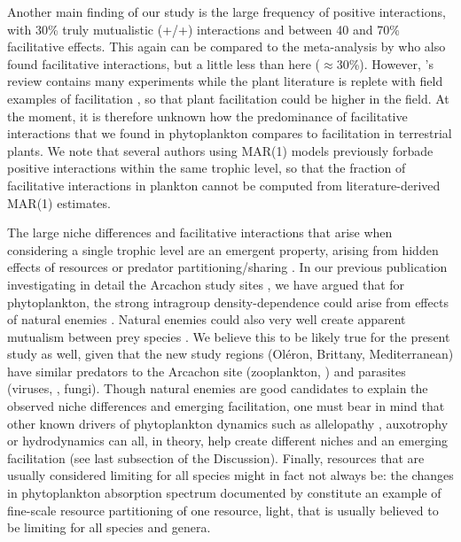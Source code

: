 \documentclass[10pt]{article}
\begin{document}
Another main finding of our study is the large frequency of positive
interactions, with 30\% truly mutualistic (+/+) interactions and between
40 and 70\% facilitative effects. This again can be compared to the
meta-analysis by \citet{adler_competition_2018} who
also found facilitative interactions, but a little less than here
($\approx$30\%). However, \citet{adler_competition_2018}'s
review contains many experiments while the plant literature is replete
with field examples of facilitation \citep{brooker_facilitation_2008,mcintire2014facilitation},
so that plant facilitation could be higher in the field. At the moment,
it is therefore unknown how the predominance of facilitative interactions
that we found in phytoplankton compares to facilitation in terrestrial
plants. We note that several authors using MAR(1) models previously
forbade positive interactions within the same trophic level, so that
the fraction of facilitative interactions in plankton cannot be computed
from literature-derived MAR(1) estimates.

The large niche differences and facilitative interactions that arise
when considering a single trophic level are an emergent property,
arising from hidden effects of resources or predator partitioning/sharing \citep{chesson_updates_2018}.
In our previous publication investigating in detail the Arcachon study
sites \citep{barraquand_coastal_2018}, we have argued that for
phytoplankton, the strong intragroup density-dependence could arise
from effects of natural enemies \citep{haydon_pivotal_1994,barraquand_coastal_2018}.
Natural enemies could also very well create apparent mutualism between
prey species \citep{abrams_apparent_1998,barraquand_indirect_2015,de_ruiter_emergent_2017}.
We believe this to be likely true for the present study as well, given
that the new study regions (Oléron, Brittany, Mediterranean) have
similar predators to the Arcachon site (zooplankton, \citealt[e.g.]{jamet_zooplankton_2001,moderan_zooplankton_2010,tortajada_network_2012})
and parasites (viruses, \citealt[e.g.]{ory_pelagic_2010}, fungi). Though
natural enemies are good candidates to explain the observed niche
differences and emerging facilitation, one must bear in mind that
other known drivers of phytoplankton dynamics such as allelopathy \citep{felpeto_allelopathy_2018},
auxotrophy \citep{tang_most_2010} or hydrodynamics \citep{levy_role_2018}
can all, in theory, help create different niches and an emerging facilitation
(see last subsection of the Discussion). Finally, resources that are
usually considered limiting for all species might in fact not always
be: the changes in phytoplankton absorption spectrum documented by \citet{burson_competition_2018} constitute an example
of fine-scale resource partitioning of one resource, light, that is
usually believed to be limiting for all species and genera.
\end{document}
